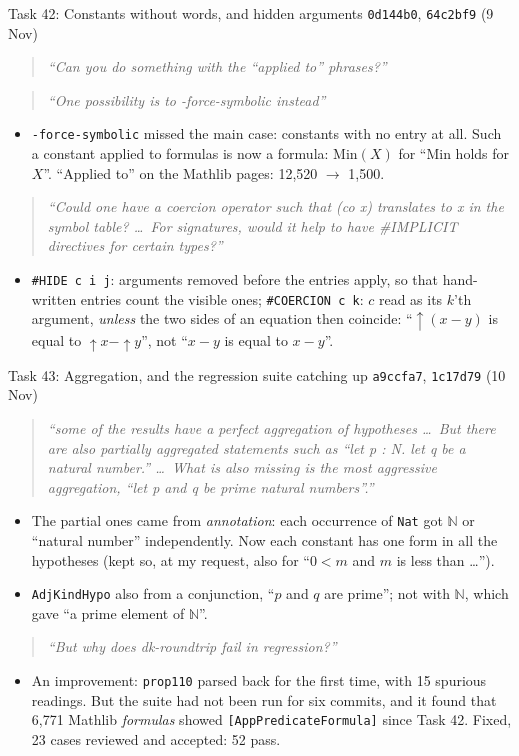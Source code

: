 \documentclass[10pt,aspectratio=169]{beamer}
\newcommand{\bad}[1]{\textcolor{warn}{#1}}
\newcommand{\ok}[1]{\textcolor{good}{#1}}
\newcommand{\commit}[1]{\texttt{\footnotesize #1}}
\newcommand{\prompt}[1]{\begin{quote}\small\itshape ``#1''\end{quote}}
\begin{document}
\begin{frame}[fragile]{Task 42: Constants without words, and hidden arguments}
  \commit{0d144b0}, \commit{64c2bf9} (9 Nov)
  \prompt{Can you do something with the ``applied to'' phrases?} \prompt{One possibility is to
  -force-symbolic instead}
  \begin{itemize}\small
    \item \texttt{-force-symbolic} missed the main case: constants with no entry at all.
          Such a constant applied to formulas is now a formula: \ok{$\mathrm{Min}(X)$} for
          \bad{``Min holds for $X$''}. ``Applied to'' on the Mathlib pages: 12,520 $\to$ 1,500.
  \end{itemize}
  \prompt{Could one have a coercion operator such that (co x) translates to x in the symbol
  table? \ldots\ For signatures, would it help to have \#IMPLICIT directives for certain types?}
  \begin{itemize}\small
    \item \texttt{\#HIDE c i j}: arguments removed before the entries apply, so that
          hand-written entries count the visible ones; \texttt{\#COERCION c k}: $c$ read as its
          $k$'th argument, \emph{unless} the two sides of an equation then coincide:
          \ok{``$\uparrow(x - y)$ is equal to $\uparrow x - \uparrow y$''}, not
          \bad{``$x - y$ is equal to $x - y$''}.
  \end{itemize}
\end{frame}

\begin{frame}{Task 43: Aggregation, and the regression suite catching up}
  \commit{a9ccfa7}, \commit{1c17d79} (10 Nov)
  \prompt{some of the results have a perfect aggregation of hypotheses \ldots\ But there are
  also partially aggregated statements such as ``let p : N. let q be a natural number.'' \ldots\
  What is also missing is the most aggressive aggregation, ``let p and q be prime natural
  numbers''.}
  \begin{itemize}\small
    \item The partial ones came from \emph{annotation}: each occurrence of \texttt{Nat} got
          $\mathbb{N}$ or ``natural number'' independently. Now each constant has
          \ok{one form in all the hypotheses} (kept so, at my request, also for
          ``$0 < m$ and $m$ is less than \ldots'').
    \item \texttt{AdjKindHypo} also from a conjunction, ``$p$ and $q$ are prime''; not with
          $\mathbb{N}$, which gave \bad{``a prime element of $\mathbb{N}$''}.
  \end{itemize}
  \prompt{But why does dk-roundtrip fail in regression?}
  \begin{itemize}\small
    \item An improvement: \texttt{prop110} parsed back for the first time, with 15 spurious
          readings. But the suite had \bad{not been run for six commits}, and it found that
          6,771 Mathlib \emph{formulas} showed \bad{\texttt{[AppPredicateFormula]}} since
          Task 42. Fixed, 23 cases reviewed and accepted: 52 pass.
  \end{itemize}
\end{frame}
\end{document}
